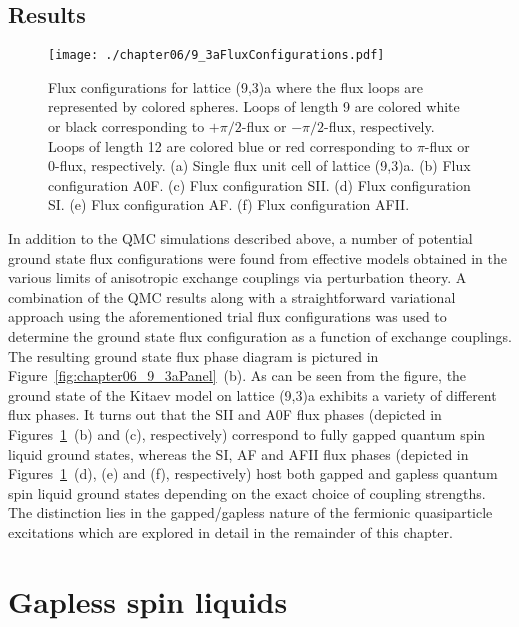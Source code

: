 \subsection{Results}
\label{section:chapter06_QMCResults}
%
%
%
\begin{figure}[tb]
	\centering
	\texttt{[image: ./chapter06/9\_3aFluxConfigurations.pdf]}
	\caption{
		Flux configurations for lattice (9,3)a where the flux loops are represented by colored spheres.
		Loops of length 9 are colored white or black corresponding to $+\pi/2$-flux or $-\pi/2$-flux, respectively.
		Loops of length 12 are colored blue or red corresponding to $\pi$-flux or $0$-flux, respectively.
		(a) Single flux unit cell of lattice (9,3)a.
		(b) Flux configuration A0F.
		(c) Flux configuration SII.
		(d) Flux configuration SI.
		(e) Flux configuration AF.
		(f) Flux configuration AFII.
	}
	\label{fig:chapter06_9_3aFluxConfigurations}
\end{figure}
%
In addition to the QMC simulations described above, a number of potential ground state flux configurations were found from effective models obtained in the various limits of anisotropic exchange couplings via perturbation theory.
A combination of the QMC results along with a straightforward variational approach using the aforementioned trial flux configurations was used to determine the ground state flux configuration as a function of exchange couplings.
The resulting ground state flux phase diagram is pictured in Figure~\ref{fig:chapter06_9_3aPanel}~(b).
As can be seen from the figure, the ground state of the Kitaev model on lattice (9,3)a exhibits a variety of different flux phases.
It turns out that the SII and A0F flux phases (depicted in Figures~\ref{fig:chapter06_9_3aFluxConfigurations}~(b) and (c), respectively) correspond to fully gapped quantum spin liquid ground states, whereas the SI, AF and AFII flux phases (depicted in Figures~\ref{fig:chapter06_9_3aFluxConfigurations}~(d), (e) and (f), respectively) host both gapped and gapless quantum spin liquid ground states depending on the exact choice of coupling strengths.
The distinction lies in the gapped/gapless nature of the fermionic quasiparticle excitations which are explored in detail in the remainder of this chapter.


%
%
\section{Gapless spin liquids}
\label{section:chapter06_GaplessSpinLiquids}
%
%
